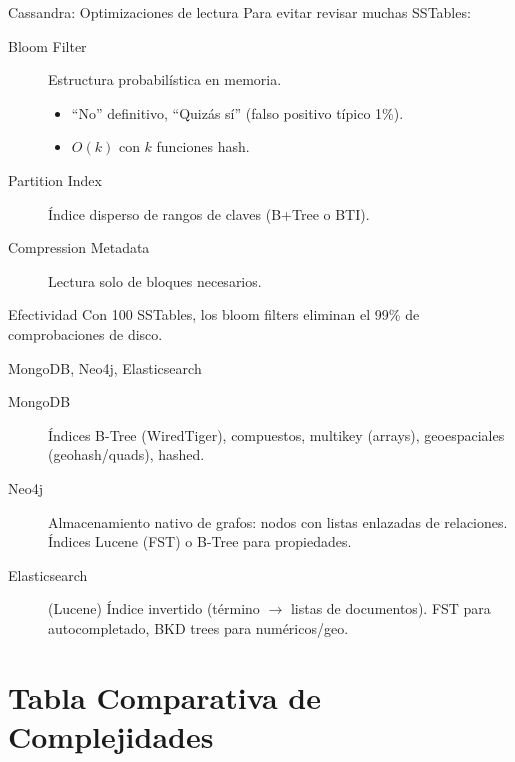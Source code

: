 \documentclass[aspectratio=169, 10pt, xcolor=table]{beamer}
\begin{document}
\begin{frame}{Cassandra: Optimizaciones de lectura}
    Para evitar revisar muchas SSTables:
    \begin{description}
        \item[Bloom Filter] Estructura probabilística en memoria.
            \begin{itemize}
                \item ``No'' definitivo, ``Quizás sí'' (falso positivo típico 1\%).
                \item $O(k)$ con $k$ funciones hash.
            \end{itemize}
        \item[Partition Index] Índice disperso de rangos de claves (B+Tree o BTI).
        \item[Compression Metadata] Lectura solo de bloques necesarios.
    \end{description}
    \begin{block}{Efectividad}
        Con 100 SSTables, los bloom filters eliminan el 99\% de comprobaciones de disco.
    \end{block}
\end{frame}

\begin{frame}{MongoDB, Neo4j, Elasticsearch}
    \begin{description}
        \item[MongoDB] Índices B-Tree (WiredTiger), compuestos, multikey (arrays), geoespaciales (geohash/quads), hashed.
        \item[Neo4j] Almacenamiento nativo de grafos: nodos con listas enlazadas de relaciones. Índices Lucene (FST) o B-Tree para propiedades.
        \item[Elasticsearch] (Lucene) Índice invertido (término $\rightarrow$ listas de documentos). FST para autocompletado, BKD trees para numéricos/geo.
    \end{description}
\end{frame}

\section{Tabla Comparativa de Complejidades}
\end{document}

